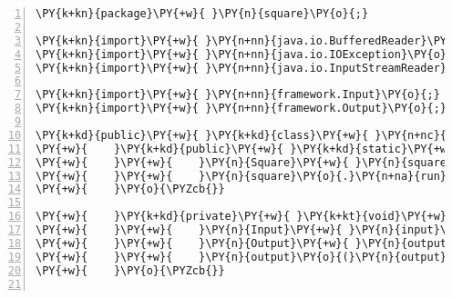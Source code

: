 \begin{Verbatim}[commandchars=\\\{\},numbers=left,firstnumber=1,stepnumber=1,frame=single,fontsize=\small]
\PY{k+kn}{package}\PY{+w}{ }\PY{n}{square}\PY{o}{;}

\PY{k+kn}{import}\PY{+w}{ }\PY{n+nn}{java.io.BufferedReader}\PY{o}{;}
\PY{k+kn}{import}\PY{+w}{ }\PY{n+nn}{java.io.IOException}\PY{o}{;}
\PY{k+kn}{import}\PY{+w}{ }\PY{n+nn}{java.io.InputStreamReader}\PY{o}{;}

\PY{k+kn}{import}\PY{+w}{ }\PY{n+nn}{framework.Input}\PY{o}{;}
\PY{k+kn}{import}\PY{+w}{ }\PY{n+nn}{framework.Output}\PY{o}{;}

\PY{k+kd}{public}\PY{+w}{ }\PY{k+kd}{class}\PY{+w}{ }\PY{n+nc}{Square}\PY{+w}{ }\PY{o}{\PYZob{}}
\PY{+w}{    }\PY{k+kd}{public}\PY{+w}{ }\PY{k+kd}{static}\PY{+w}{ }\PY{k+kt}{void}\PY{+w}{ }\PY{n+nf}{main}\PY{o}{(}\PY{n}{String}\PY{o}{[}\PY{o}{]}\PY{+w}{ }\PY{n}{args}\PY{o}{)}\PY{+w}{ }\PY{k+kd}{throws}\PY{+w}{ }\PY{n}{Exception}\PY{+w}{ }\PY{o}{\PYZob{}}
\PY{+w}{    }\PY{+w}{    }\PY{n}{Square}\PY{+w}{ }\PY{n}{square}\PY{+w}{ }\PY{o}{=}\PY{+w}{ }\PY{k}{new}\PY{+w}{ }\PY{n}{Square}\PY{o}{(}\PY{o}{)}\PY{o}{;}
\PY{+w}{    }\PY{+w}{    }\PY{n}{square}\PY{o}{.}\PY{n+na}{run}\PY{o}{(}\PY{o}{)}\PY{o}{;}
\PY{+w}{    }\PY{o}{\PYZcb{}}

\PY{+w}{    }\PY{k+kd}{private}\PY{+w}{ }\PY{k+kt}{void}\PY{+w}{ }\PY{n+nf}{run}\PY{o}{(}\PY{o}{)}\PY{+w}{ }\PY{k+kd}{throws}\PY{+w}{ }\PY{n}{Exception}\PY{+w}{ }\PY{o}{\PYZob{}}
\PY{+w}{    }\PY{+w}{    }\PY{n}{Input}\PY{+w}{ }\PY{n}{input}\PY{+w}{ }\PY{o}{=}\PY{+w}{ }\PY{n}{input}\PY{o}{(}\PY{o}{)}\PY{o}{;}
\PY{+w}{    }\PY{+w}{    }\PY{n}{Output}\PY{+w}{ }\PY{n}{output}\PY{+w}{ }\PY{o}{=}\PY{+w}{ }\PY{n}{process}\PY{o}{(}\PY{n}{input}\PY{o}{)}\PY{o}{;}
\PY{+w}{    }\PY{+w}{    }\PY{n}{output}\PY{o}{(}\PY{n}{output}\PY{o}{)}\PY{o}{;}
\PY{+w}{    }\PY{o}{\PYZcb{}}


\end{Verbatim}
